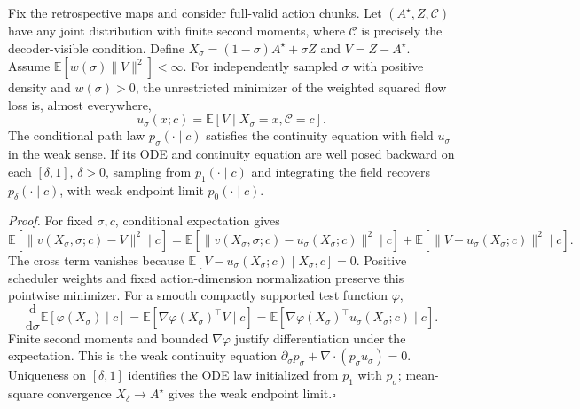 \begin{warmproposition}
\label{prop:conditional_flow}
Fix the retrospective maps and consider full-valid action chunks.
Let $(A^\star,Z,\mathcal C)$ have any joint distribution with finite second moments, where $\mathcal C$ is precisely the decoder-visible condition.
Define $X_\sigma=(1-\sigma)A^\star+\sigma Z$ and $V=Z-A^\star$.
Assume $\mathbb E[w(\sigma)\|V\|^2]<\infty$. For independently sampled $\sigma$ with positive density and $w(\sigma)>0$, the unrestricted minimizer of the weighted squared flow loss is, almost everywhere,
\begin{equation}
 u_\sigma(x;c)=\mathbb E[V\mid X_\sigma=x,\mathcal C=c].
 \label{eq:optimal_conditional_field}
\end{equation}
The conditional path law $p_\sigma(\cdot\mid c)$ satisfies the continuity equation with field $u_\sigma$ in the weak sense.
If its ODE and continuity equation are well posed backward on each $[\delta,1]$, $\delta>0$, sampling from $p_1(\cdot\mid c)$ and integrating the field recovers $p_\delta(\cdot\mid c)$, with weak endpoint limit $p_0(\cdot\mid c)$.
\end{warmproposition}

\noindent\emph{Proof.}
For fixed $\sigma,c$, conditional expectation gives
\begin{equation}
 \mathbb E[\|v(X_\sigma,\sigma;c)-V\|^2\mid c]
 =\mathbb E[\|v(X_\sigma,\sigma;c)-u_\sigma(X_\sigma;c)\|^2\mid c]
 +\mathbb E[\|V-u_\sigma(X_\sigma;c)\|^2\mid c].
 \label{eq:conditional_orthogonality}
\end{equation}
The cross term vanishes because $\mathbb E[V-u_\sigma(X_\sigma;c)\mid X_\sigma,c]=0$.
Positive scheduler weights and fixed action-dimension normalization preserve this pointwise minimizer.
For a smooth compactly supported test function $\varphi$,
\begin{equation}
 \frac{\mathrm d}{\mathrm d\sigma}\mathbb E[\varphi(X_\sigma)\mid c]
 =\mathbb E[\nabla\varphi(X_\sigma)^\top V\mid c]
 =\mathbb E[\nabla\varphi(X_\sigma)^\top u_\sigma(X_\sigma;c)\mid c].
 \label{eq:weak_continuity}
\end{equation}
Finite second moments and bounded $\nabla\varphi$ justify differentiation under the expectation.
This is the weak continuity equation $\partial_\sigma p_\sigma+\nabla\!\cdot(p_\sigma u_\sigma)=0$.
Uniqueness on $[\delta,1]$ identifies the ODE law initialized from $p_1$ with $p_\sigma$; mean-square convergence $X_\delta\to A^\star$ gives the weak endpoint limit.\hfill$\square$

